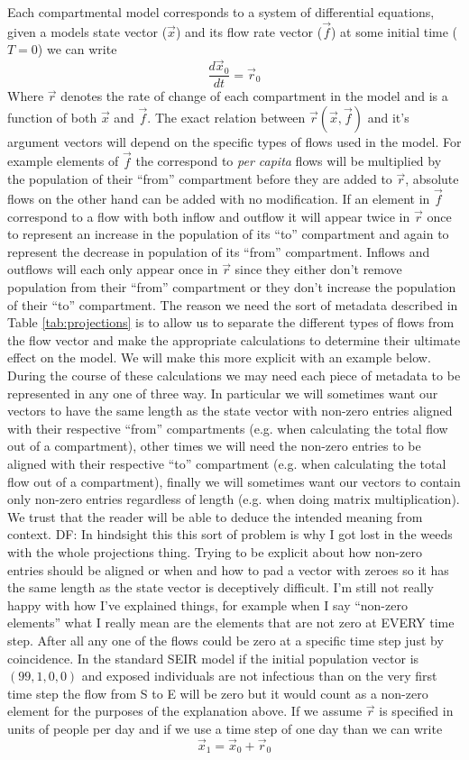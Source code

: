 \documentclass[referee,sn-basic]{sn-jnl}%
\theoremstyle{definition}
\newcommand{\df}[1]{{\color{orange} DF: #1}}
\newcommand{\xvec}{\vec{x}}
\newcommand{\fvec}{\vec{f}}
\newcommand{\rvec}{\vec{r}}
\begin{document}
Each compartmental model corresponds to a system of differential equations, given a models state vector ($\xvec$) and its flow rate vector ($\fvec$) at some initial time ($T=0$) we can write
\[
    \frac{d\xvec_0}{dt} = \rvec_0
\]
Where $\rvec$ denotes the rate of change of each compartment in the model and is a function of both $\xvec$ and $\fvec$. The exact relation between $\rvec(\xvec, \fvec)$ and it's argument vectors will depend on the specific types of flows used in the model. For example elements of $\fvec$ the correspond to \emph{per capita} flows will be multiplied by the population of their ``from'' compartment before they are added to $\rvec$, absolute flows on the other hand can be added with no modification. If an element in $\fvec$ correspond to a flow with both inflow and outflow it will appear twice in $\rvec$ once to represent an increase in the population of its ``to'' compartment and again to represent the decrease in population of its ``from'' compartment. Inflows and outflows will each only appear once in $\rvec$ since they either don't remove population from their ``from'' compartment or they don't increase the population of their ``to'' compartment. The reason we need the sort of metadata described in Table \ref{tab:projections} is to allow us to separate the different types of flows from the flow vector and make the appropriate calculations to determine their ultimate effect on the model. We will make this more explicit with an example below. During the course of these calculations we may need each piece of metadata to be represented in any one of three way. In particular we will sometimes want our vectors to have the same length as the state vector with non-zero entries aligned with their respective ``from'' compartments (e.g. when calculating the total flow out of a compartment), other times we will need the non-zero entries to be aligned with their respective ``to'' compartment (e.g. when calculating the total flow out of a compartment), finally we will sometimes want our vectors to contain only non-zero entries regardless of length (e.g. when doing matrix multiplication). We trust that the reader will be able to deduce the intended meaning from context. \df{In hindsight this this sort of problem is why I got lost in the weeds with the whole projections thing. Trying to be explicit about how non-zero entries should be aligned or when and how to pad a vector with zeroes so it has the same length as the state vector is deceptively difficult. I'm still not really happy with how I've explained things, for example when I say ``non-zero elements'' what I really mean are the elements that are not zero at EVERY time step. After all any one of the flows could be zero at a specific time step just by coincidence. In the standard SEIR model if the initial population vector is $(99,1,0,0)$ and exposed individuals are not infectious than on the very first time step the flow from S to E will be zero but it would count as a non-zero element for the purposes of the explanation above.} If we assume $\rvec$ is specified in units of people per day and if we use a time step of one day than we can write
\[
    \xvec_1 = \xvec_0 + \rvec_0
\]
\end{document}
